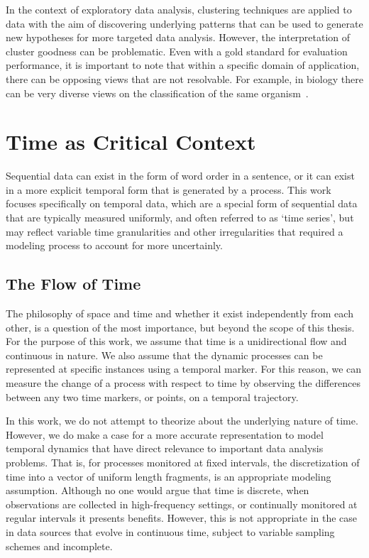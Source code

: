 In the context of exploratory data analysis, clustering techniques are applied to data with the aim of discovering underlying patterns that can be used to generate new hypotheses for more targeted data analysis.  However, the interpretation of cluster goodness can be problematic.  Even with a gold standard for evaluation performance, it is important to note that within a specific domain of application, there can be opposing views that are not resolvable.  For example, in biology there can be very diverse views on the classification of the same organism~\cite{pmid20500846,pmid23209778}.

\section{Time as Critical Context}
Sequential data can exist in the form of word order in a sentence, or it can exist in a more explicit temporal form that is generated by a process.  This work focuses specifically on temporal data, which are a special form of sequential data that are typically measured uniformly, and often referred to as `time series', but may reflect variable time granularities and other irregularities that required a modeling process to account for more uncertainly.

\subsection{The Flow of Time}
The philosophy of space and time and whether it exist independently from each other, is a question of the most importance, but beyond the scope of this thesis.  For the purpose of this work, we assume that time is a unidirectional flow and continuous in nature.  We also assume that the dynamic processes can be represented at specific instances using a temporal marker.  For this reason, we can measure the change of a process with respect to time by observing the differences between any two time markers, or points, on a temporal trajectory.

In this work, we do not attempt to theorize about the underlying nature of time.  However, we do make a case for a more accurate representation to model temporal dynamics that have direct relevance to important data analysis problems.  That is, for processes monitored at fixed intervals, the discretization of time into a vector of uniform length fragments, is an appropriate modeling assumption.  Although no one would argue that time is discrete, when observations are collected in high-frequency settings, or continually monitored at regular intervals it presents benefits.  However, this is not appropriate in the case in data sources that evolve in continuous time, subject to variable sampling schemes and incomplete.


